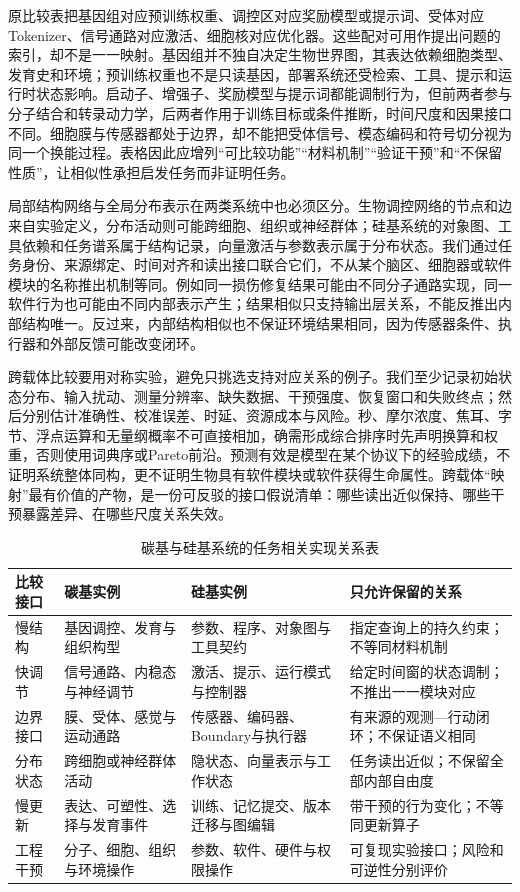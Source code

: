 原比较表把基因组对应预训练权重、调控区对应奖励模型或提示词、受体对应Tokenizer、信号通路对应激活、细胞核对应优化器。这些配对可用作提出问题的索引，却不是一一映射。基因组并不独自决定生物世界图，其表达依赖细胞类型、发育史和环境；预训练权重也不是只读基因，部署系统还受检索、工具、提示和运行时状态影响。启动子、增强子、奖励模型与提示词都能调制行为，但前两者参与分子结合和转录动力学，后两者作用于训练目标或条件推断，时间尺度和因果接口不同。细胞膜与传感器都处于边界，却不能把受体信号、模态编码和符号切分视为同一个换能过程。表格因此应增列“可比较功能”“材料机制”“验证干预”和“不保留性质”，让相似性承担启发任务而非证明任务。

局部结构网络与全局分布表示在两类系统中也必须区分。生物调控网络的节点和边来自实验定义，分布活动则可能跨细胞、组织或神经群体；硅基系统的对象图、工具依赖和任务谱系属于结构记录，向量激活与参数表示属于分布状态。我们通过任务身份、来源绑定、时间对齐和读出接口联合它们，不从某个脑区、细胞器或软件模块的名称推出机制等同。例如同一损伤修复结果可能由不同分子通路实现，同一软件行为也可能由不同内部表示产生；结果相似只支持输出层关系，不能反推出内部结构唯一。反过来，内部结构相似也不保证环境结果相同，因为传感器条件、执行器和外部反馈可能改变闭环。

跨载体比较要用对称实验，避免只挑选支持对应关系的例子。我们至少记录初始状态分布、输入扰动、测量分辨率、缺失数据、干预强度、恢复窗口和失败终点；然后分别估计准确性、校准误差、时延、资源成本与风险。秒、摩尔浓度、焦耳、字节、浮点运算和无量纲概率不可直接相加，确需形成综合排序时先声明换算和权重，否则使用词典序或Pareto前沿。预测有效是模型在某个协议下的经验成绩，不证明系统整体同构，更不证明生物具有软件模块或软件获得生命属性。跨载体“映射”最有价值的产物，是一份可反驳的接口假说清单：哪些读出近似保持、哪些干预暴露差异、在哪些尺度关系失效。

\begin{table}[htbp]
\centering
\scriptsize
\renewcommand{\arraystretch}{1.25}
\begin{tabularx}{\textwidth}{p{2.1cm}|X|X|X}
\toprule
\rowcolor{structurecolor!20} \textbf{比较接口} & \textbf{碳基实例} & \textbf{硅基实例} & \textbf{只允许保留的关系} \\
\midrule
慢结构 & 基因调控、发育与组织构型 & 参数、程序、对象图与工具契约 & 指定查询上的持久约束；不等同材料机制 \\
\hline
快调节 & 信号通路、内稳态与神经调节 & 激活、提示、运行模式与控制器 & 给定时间窗的状态调制；不推出一一模块对应 \\
\hline
边界接口 & 膜、受体、感觉与运动通路 & 传感器、编码器、Boundary与执行器 & 有来源的观测—行动闭环；不保证语义相同 \\
\hline
分布状态 & 跨细胞或神经群体活动 & 隐状态、向量表示与工作状态 & 任务读出近似；不保留全部内部自由度 \\
\hline
慢更新 & 表达、可塑性、选择与发育事件 & 训练、记忆提交、版本迁移与图编辑 & 带干预的行为变化；不等同更新算子 \\
\hline
工程干预 & 分子、细胞、组织与环境操作 & 参数、软件、硬件与权限操作 & 可复现实验接口；风险和可逆性分别评价 \\
\bottomrule
\end{tabularx}
\caption{碳基与硅基系统的任务相关实现关系表}
\label{tab:carbon_silicon_isomorphism}
\end{table}

